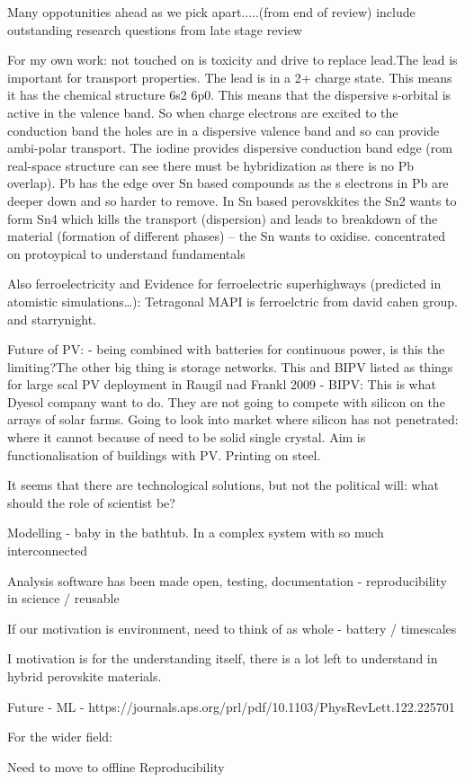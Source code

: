 

Many oppotunities ahead as we pick apart.....(from end of review)
include outstanding research questions from late stage review

For my own work:
not touched on is toxicity and drive to replace lead.The lead is important for transport properties. The lead is in a 2+ charge state. This means it has the chemical structure 6s2 6p0. This means that the dispersive s-orbital is active in the valence band. So when charge electrons are excited to the conduction band the holes are in a dispersive valence band and so can provide ambi-polar transport. The iodine provides dispersive conduction band edge (rom real-space structure can see there must be hybridization as there is no Pb overlap). Pb has the edge over Sn based compounds as the s electrons in Pb are deeper down and so harder to remove. In Sn based perovskkites the Sn2 wants to form Sn4 which kills the transport (dispersion) and leads to breakdown of the material (formation of different phases) – the Sn wants to oxidise.
 concentrated on protoypical to understand fundamentals
 
 Also ferroelectricity and Evidence for ferroelectric superhighways (predicted in atomistic simulations…): Tetragonal MAPI is ferroelctric from david cahen group. and starrynight.
 
 Future of PV:
 - being combined with batteries for continuous power, is this the limiting?The other big thing is storage networks. This and BIPV listed as things for large scal PV deployment in Raugil nad Frankl 2009
- BIPV: This is what Dyesol company want to do. They are not going to compete with silicon on the arrays of solar farms. Going to look into market where silicon has not penetrated: where it cannot because of need to be solid single crystal. Aim is functionalisation of buildings with PV. Printing on steel.
 
 It seems that there are technological solutions, but not the political will: what should the role of scientist be?
 
 Modelling - baby in the bathtub. In a complex system with so much interconnected
 
 Analysis software has been made open, testing, documentation - reproducibility in science / reusable
 
 If our motivation is environment, need to think of as whole - battery / timescales
 
 I motivation is for the understanding itself, there is a lot left to understand in hybrid perovskite materials.
 
 Future - ML - https://journals.aps.org/prl/pdf/10.1103/PhysRevLett.122.225701

For the wider field:

Need to move to offline
Reproducibility